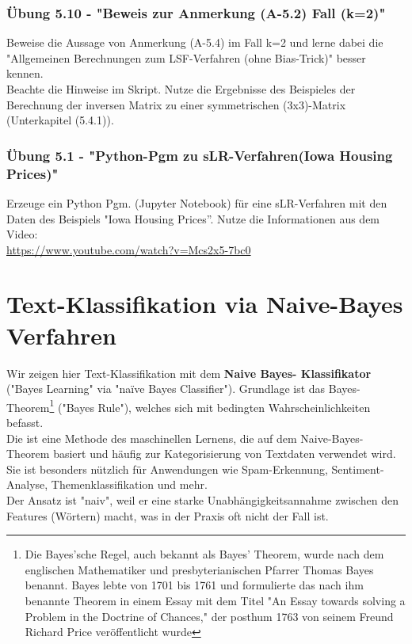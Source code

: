 \documentclass[12pt]{article}
\begin{document}
\subsubsection{Übung 5.10 - "Beweis zur Anmerkung (A-5.2) Fall (k=2)"}
%
Beweise die Aussage von Anmerkung (A-5.4) im Fall k=2 und lerne dabei die "Allgemeinen Berechnungen zum LSF-Verfahren (ohne Bias-Trick)" besser kennen. \\ Beachte die Hinweise im Skript. Nutze die Ergebnisse des Beispieles der Berechnung der inversen Matrix zu einer symmetrischen (3x3)-Matrix (Unterkapitel (5.4.1)).

\subsubsection{Übung 5.1 - "Python-Pgm zu sLR-Verfahren(Iowa Housing Prices)"}
%
Erzeuge ein Python Pgm. (Jupyter Notebook) für eine sLR-Verfahren mit den Daten des Beispiels "Iowa Housing Prices”. Nutze die Informationen aus dem Video:\\
\url{https://www.youtube.com/watch?v=Mcs2x5-7bc0}\\ 

\newpage

\section{Text-Klassifikation via Naive-Bayes Verfahren \\}


Wir zeigen hier Text-Klassifikation mit dem \textbf{Naive Bayes- Klassifikator} ("Bayes Learning" via "naïve Bayes Classifier"). Grundlage ist das Bayes-Theorem\footnote{Die Bayes'sche Regel, auch bekannt als Bayes' Theorem, wurde nach dem englischen Mathematiker und presbyterianischen Pfarrer Thomas Bayes benannt. Bayes lebte von 1701 bis 1761 und formulierte das nach ihm benannte Theorem in einem Essay mit dem Titel "An Essay towards solving a Problem in the Doctrine of Chances," der posthum 1763 von seinem Freund Richard Price veröffentlicht wurde} ("Bayes Rule"), welches sich mit bedingten Wahrscheinlichkeiten befasst.\\
Die {\color{blue}{Naive-Bayes-Textklassifikation}}  ist eine Methode des maschinellen Lernens, die auf dem Naive-Bayes-Theorem basiert und häufig zur Kategorisierung von Textdaten verwendet wird. Sie ist besonders nützlich für Anwendungen wie Spam-Erkennung, Sentiment-Analyse, Themenklassifikation und mehr.\\
%
Der Ansatz ist "naiv", weil er eine starke Unabhängigkeitsannahme zwischen den Features (Wörtern) macht, was in der Praxis oft nicht der Fall ist.
\end{document}
